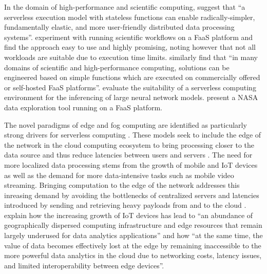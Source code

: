 In the domain of high-performance and scientific computing, \textcite{jonas17occupy} suggest that ``a serverless execution model with stateless functions can enable radically-simpler, fundamentally elastic, and more user-friendly distributed data processing systems''. \textcite{malawski17executescientific} experiment with running scientific workflows on a FaaS platform and find the approach easy to use and highly promising, noting however that not all workloads are suitable due to execution time limits. \textcite{spillner18faaster} similarly find that ``in many domains of scientific and high-performance computing, solutions can be engineered based on simple functions which are executed on commercially offered or self-hosted FaaS platforms''. \textcite{ishakian17neural} evaluate the suitability of a serverless computing environment for the inferencing of large neural network models. \textcite{petrenko17nasa} present a NASA data exploration tool running on a FaaS platform.

The novel paradigms of edge and fog computing are identified as particularly strong drivers for serverless computing \parencite{fox17}. These models seek to include the edge of the network in the cloud computing ecosystem to bring processing closer to the data source and thus reduce latencies between users and servers \parencite{buyya2017manifesto}. The need for more localized data processing stems from the growth of mobile and IoT devices as well as the demand for more data-intensive tasks such as mobile video streaming. Bringing computation to the edge of the network addresses this inreasing demand by avoiding the bottlenecks of centralized servers and latencies introduced by sending and retrieving heavy payloads from and to the cloud \parencite{baresi17edgecomputing}. \textcite{nastic17analyticsedge} explain how the increasing growth of IoT devices has lead to ``an abundance of geographically dispersed computing infrastructure and edge resources that remain largely underused for data analytics applications'' and how ``at the same time, the value of data becomes effectively lost at the edge by remaining inaccessible to the more powerful data analytics in the cloud due to networking costs, latency issues, and limited interoperability between edge devices''.

